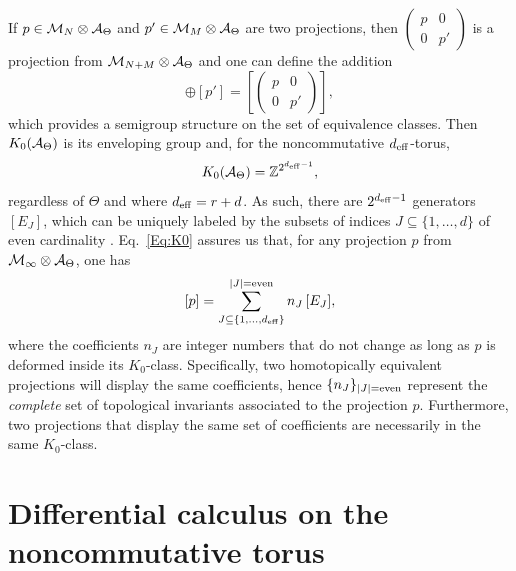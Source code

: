 \documentclass[
    10pt,
    aps,
    prb,
    twocolumn,
    floatfix,
    superscriptaddress,
]{revtex4-2}
\begin{document}
If $p \in {\mathcal M}_N \otimes {\mathcal A}_\Theta$ and $p' \in {\mathcal M}_M \otimes {\mathcal A}_\Theta$ are two projections, then $\begin{pmatrix} p & 0 \\ 0 & p' \end{pmatrix}$ is a projection from ${\mathcal M}_{N+M} \otimes {\mathcal A}_\Theta$ and one can define the addition
\begin{equation}
[p] \oplus [p'] = \left [  \left( \begin{matrix} p & 0 \\ 0 & p' \end{matrix} \right) \right ],
\end{equation}
which provides a semigroup structure on the set of equivalence classes. Then $K_0({\mathcal A}_\Theta)$ is its  enveloping group \cite{Blackadar1998} and, for the noncommutative ${d_\mathrm{eff}}$-torus,
\begin{equation}\label{Eq:K0} 
K_0({\mathcal A}_\Theta) = {\mathbb Z}^{2^{{d_\mathrm{eff}}-1}},
\end{equation}
regardless of $\Theta$ and where ${d_\mathrm{eff}} = r+d$.
As such, there are $2^{{d_\mathrm{eff}}-1}$ generators $[E_J]$, which can be uniquely labeled by the subsets of indices $J \subseteq \{1,\ldots,d\}$ of even cardinality \cite{Prodan2016}. Eq.~\eqref{Eq:K0} assures us that, for any projection $p$ from ${\mathcal M}_\infty \otimes {\mathcal A}_\Theta$, one has
\begin{equation}\label{Eq-GenExpansion}
[p]  = \sum_{J \subseteq \{1,\ldots,{d_\mathrm{eff}} \}}^{|J|={\rm even}} n_J \, [E_J], 
\end{equation} 
where the coefficients $n_J$ are integer numbers that do not change as long as $p$ is deformed inside its $K_0$-class. 
Specifically, two homotopically equivalent projections will display the same coefficients, hence $\{n_J\}_{|J|={\rm even}}$ represent the {\it complete} set of topological invariants associated to the projection $p$. 
Furthermore, two projections that display the same set of coefficients are necessarily in the same $K_0$-class. 

\section{Differential calculus on the noncommutative torus}
\label{app:differential_calculus}
\end{document}
